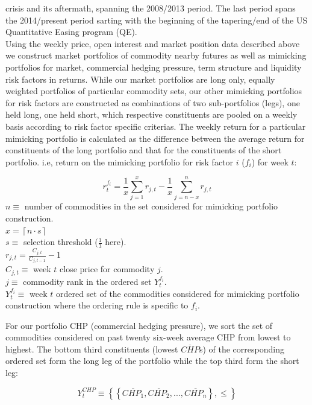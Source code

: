 \documentclass[]{elsarticle} %
\begin{document}
crisis and its aftermath, spanning the 2008/2013 period. The last period
spans the 2014/present period sarting with the beginning of the
tapering/end of the US Quantitative Easing program (QE).\\
Using the weekly price, open interest and market position data described
above we construct market portfolios of commodity nearby futures as well
as mimicking portfolios for market, commercial hedging pressure, term
structure and liquidity risk factors in returns. While our market
portfolios are long only, equally weighted portfolios of particular
commodity sets, our other mimicking portfolios for risk factors are
constructed as combinations of two sub-portfolios (legs), one held long,
one held short, which respective constituents are pooled on a weekly
basis according to risk factor specific criterias. The weekly return for
a particular mimicking portfolio is calculated as the difference between
the average return for constituents of the long portfolio and that for
the constituents of the short portfolio. i.e, return on the mimicking
portfolio for risk factor \(i\) (\(f_{i}\)) for week \(t\):

\[r_{t}^{f_{i}}=\frac{1}{x}\sum_{j=1}^{x}r_{j,t}-\frac{1}{x}\sum_{j=n-x}^{n}r_{j,t}\]
\(n\equiv\) number of commodities in the set considered for mimicking
portfolio construction.\\
\(x = \left \lceil n \cdot s \right \rceil\)\\
\(s\equiv\) selection threshold (\(\frac{1}{3}\) here).\\
\(r_{j,t}=\frac{C_{j,t}}{C_{j,t-1}}-1\)\\
\(C_{j,t}\equiv\) week \(t\) close price for commodity \(j\).\\
\(j\equiv\) commodity rank in the ordered set \(Y_{t}^{f_{i}}\).\\
\(Y_{t}^{f_{i}}\equiv\) week \(t\) ordered set of the commodities
considered for mimicking portfolio construction where the ordering rule
is specific to \(f_{i}\).

For our portfolio CHP (commercial hedging pressure), we sort the set of
commodities considered on past twenty six-week average CHP from lowest
to highest. The bottom third constituents (lowest \(\overline{CHP}\)s)
of the corresponding ordered set form the long leg of the portfolio
while the top third form the short leg:

\[Y_{t}^{CHP}\equiv\left \{ \left \{ \overline{CHP_{1}}, \overline{CHP_{2}}, ..., \overline{CHP_{n}} \right \}, \leq \right \}\]
\end{document}
